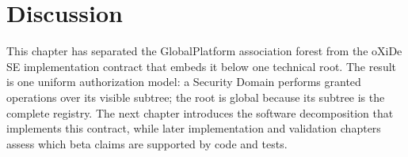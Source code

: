 \section{Discussion}


This chapter has separated the GlobalPlatform association forest from the
oXiDe SE implementation contract that embeds it below one technical root. The
result is one uniform authorization model: a Security Domain performs granted
operations over its visible subtree; the root is global because its subtree is
the complete registry. The next chapter introduces the software decomposition
that implements this contract, while later implementation and validation
chapters assess which beta claims are supported by code and tests.

